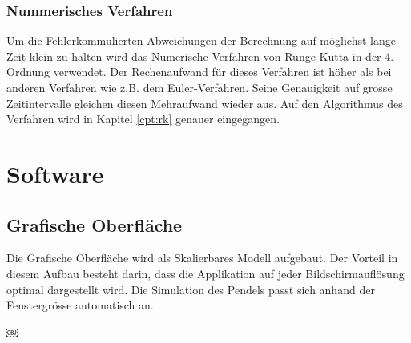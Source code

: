 \documentclass[12pt]{article}
\numberwithin{equation}{subsection}
\begin{document}
\subsubsection{Nummerisches Verfahren}
Um die Fehlerkommulierten Abweichungen der Berechnung auf möglichst lange Zeit klein zu halten wird das Numerische Verfahren von Runge-Kutta in der 4. Ordnung verwendet. Der Rechenaufwand für dieses Verfahren ist höher als bei anderen Verfahren wie z.B. dem Euler-Verfahren. Seine Genauigkeit auf grosse Zeitintervalle gleichen diesen Mehraufwand wieder aus. Auf den Algorithmus des Verfahren wird in Kapitel \ref{cpt:rk} genauer  eingegangen.

\newpage
\section{Software}
\subsection{Grafische Oberfläche}
Die Grafische Oberfläche wird als Skalierbares Modell aufgebaut. Der Vorteil in diesem Aufbau besteht darin, dass die Applikation auf jeder Bildschirmauflösung optimal dargestellt wird. Die Simulation des Pendels passt sich anhand der Fenstergrösse automatisch an.

\newpage
￼\listoffigures



\end{document}

